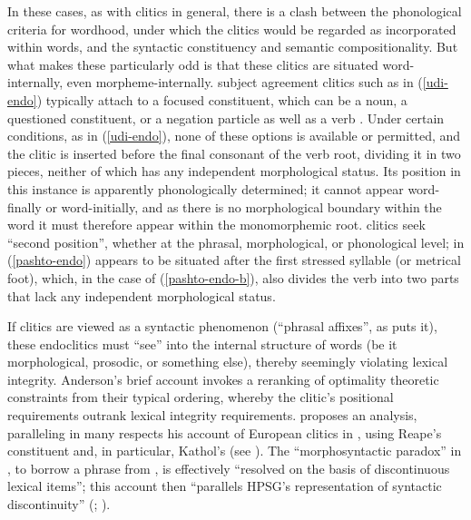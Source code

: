 \documentclass[output=paper
 	        ,biblatex
                ,babelshorthands
                ,newtxmath
                ,draftmode
                ,colorlinks, citecolor=brown
]{langscibook}
\begin{document}
In these cases, as with clitics in general, there is a clash between the phonological criteria for wordhood, under which the clitics would be regarded as incorporated within words, and the syntactic constituency and semantic compositionality.
But what makes these particularly odd is that these clitics are situated word-internally, even morpheme-internally. 
 subject agreement clitics such as  in (\ref{udi-endo}) typically attach to a focused constituent, which can be a noun, a questioned constituent, or a negation particle as well as a verb \citep{Harris2000}.
Under certain conditions, as in (\ref{udi-endo}), none of these options is available or permitted, and the clitic is inserted before the final consonant of the verb root, dividing it in two pieces, neither of which has any independent morphological status.
Its position in this instance is apparently phonologically determined; it cannot appear word-finally or word-initially, and as there is no morphological boundary within the word it must therefore appear within the monomorphemic root.
 clitics  seek ``second position'', whether at the phrasal, morphological, or phonological level;  in (\ref{pashto-endo}) appears to be situated after the first stressed syllable (or metrical foot), which, in the case of (\ref{pashto-endo-b}), also divides the verb into two parts that lack any independent morphological status.

If clitics are viewed as a syntactic phenomenon (``phrasal affixes'', as \citealt{Anderson2005} puts
it), these endoclitics must ``see'' into the internal structure of words (be it morphological,
prosodic, or something else), thereby seemingly violating  lexical
integrity. Anderson's brief account invokes a reranking of optimality theoretic constraints from
their typical ordering, whereby the clitic's positional requirements outrank lexical integrity
requirements. \citet{Crysmann2000b} proposes an analysis, paralleling in many respects his account
of European  clitics in \citet{Crysmann2000a}, using Reape's constituent  \citep{Reape1994} and, in particular, Kathol's 
\citep{Kathol2000a}\addpages (see ). The ``morphosyntactic paradox'' in , to borrow
a phrase from \citet[]{Crysmann2003d}, is effectively ``resolved on the basis of discontinuous lexical items''; this account then ``parallels HPSG's representation of syntactic discontinuity'' (\citealt{Crysmann2000b}; ).
\end{document}
